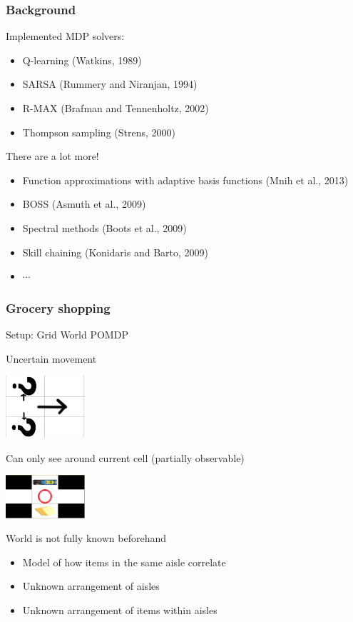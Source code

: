 \documentclass[10pt, compress]{beamer}
\begin{document}
\begin{frame}[fragile]
  \frametitle{Background}

  Implemented MDP solvers:
  \begin{itemize}
  \item Q-learning \alert{(Watkins, 1989)}
  \item SARSA \alert{(Rummery and Niranjan, 1994)}
  \item R-MAX \alert{(Brafman and Tennenholtz, 2002)}
  \item Thompson sampling \alert{(Strens, 2000)}
  \end{itemize}

  There are a lot more!
  \begin{itemize}
  \item Function approximations with adaptive basis functions \alert{(Mnih et
  al., 2013)}
  \item BOSS \alert{(Asmuth et al., 2009)}
  \item Spectral methods \alert{(Boots et al., 2009)}
  \item Skill chaining \alert{(Konidaris and Barto, 2009)}
  \item $\cdots$
  \end{itemize}

\end{frame}

\begin{frame}[fragile]
  \frametitle{Grocery shopping}

  Setup: Grid World POMDP

  Uncertain movement

  \centerline{\includegraphics[width=0.22\textwidth]{img/uncertain_transition.png}}

  Can only see around current cell (partially observable)

  \centerline{\includegraphics[width=0.22\textwidth]{img/partial_obs.png}}

  World is not fully known beforehand
  \begin{itemize}
  \item Model of how items in the same aisle correlate
  \item Unknown arrangement of aisles
  \item Unknown arrangement of items within aisles
  \end{itemize}
\end{frame}
\end{document}
